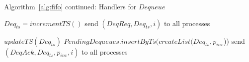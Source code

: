 \documentclass[a4paper,anonymous,USenglish]{lipics-v2021} %
\theoremstyle{definition}
\newcommand{\red}[1]{\textcolor{red}{#1}} %
\begin{document}
\begin{algorithm}
  \caption{Algorithm~\ref{alg:fifo} continued: Handlers for $Dequeue$}
  \begin{algorithmic}[1]
      \State $Deq_{ts} = incrementTS()$ \label{fifoline:deqTS}
      \State send $(DeqReq, Deq_{ts}, i)$ to all processes \label{fifoline:sendDeqReq}
    \EndFunction

    \State $updateTS(Deq_{ts})$ \label{fifoline:deqReqTSUpdate}
      \State $PendingDequeues.insertByTs(createList(Deq_{ts}, p_{inv}$))\label{fifoline:savePendingDeq}
      \EndIf
      \State send $(DeqAck, Deq_{ts}, p_{inv}, i)$ to all processes \label{fifoline:sendSafetyFlag}\label{fifoline:sendDeqAck}
    \EndFunction


\end{algorithmic}
\end{algorithm}
\end{document}
